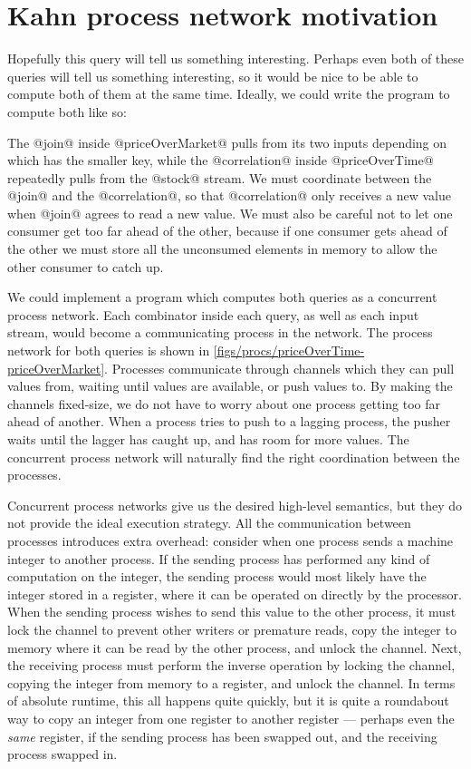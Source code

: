 \section{Kahn process network motivation}

Hopefully this query will tell us something interesting.
Perhaps even both of these queries will tell us something interesting, so it would be nice to be able to compute both of them at the same time.
Ideally, we could write the program to compute both like so:

The @join@ inside @priceOverMarket@ pulls from its two inputs depending on which has the smaller key, while the @correlation@ inside @priceOverTime@ repeatedly pulls from the @stock@ stream.
We must coordinate between the @join@ and the @correlation@, so that @correlation@ only receives a new value when @join@ agrees to read a new value.
We must also be careful not to let one consumer get too far ahead of the other, because if one consumer gets ahead of the other we must store all the unconsumed elements in memory to allow the other consumer to catch up.



We could implement a program which computes both queries as a concurrent process network.
Each combinator inside each query, as well as each input stream, would become a communicating process in the network.
The process network for both queries is shown in \autoref{figs/procs/priceOverTime-priceOverMarket}.
Processes communicate through channels which they can pull values from, waiting until values are available, or push values to.
By making the channels fixed-size, we do not have to worry about one process getting too far ahead of another.
When a process tries to push to a lagging process, the pusher waits until the lagger has caught up, and has room for more values.
The concurrent process network will naturally find the right coordination between the processes.

Concurrent process networks give us the desired high-level semantics, but they do not provide the ideal execution strategy.
All the communication between processes introduces extra overhead: consider when one process sends a machine integer to another process.
If the sending process has performed any kind of computation on the integer, the sending process would most likely have the integer stored in a register, where it can be operated on directly by the processor.
When the sending process wishes to send this value to the other process, it must lock the channel to prevent other writers or premature reads, copy the integer to memory where it can be read by the other process, and unlock the channel.
Next, the receiving process must perform the inverse operation by locking the channel, copying the integer from memory to a register, and unlock the channel.
In terms of absolute runtime, this all happens quite quickly, but it is quite a roundabout way to copy an integer from one register to another register --- perhaps even the \emph{same} register, if the sending process has been swapped out, and the receiving process swapped in.

